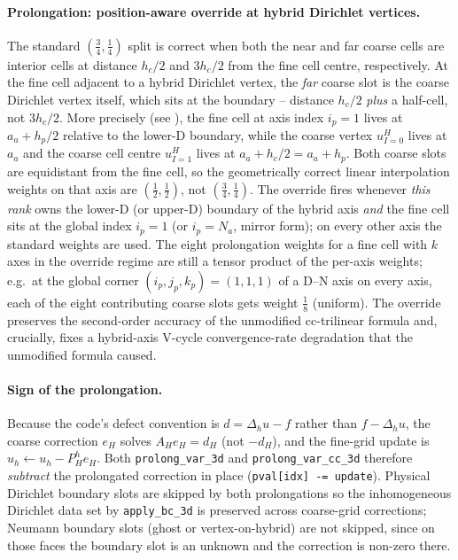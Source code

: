 \documentclass[11pt]{article}
\theoremstyle{definition}
\begin{document}
\paragraph{Prolongation: position-aware override at hybrid Dirichlet
vertices.}
The standard $(\tfrac{3}{4}, \tfrac{1}{4})$ split is correct when
both the near and far coarse cells are interior cells at distance
$h_c / 2$ and $3 h_c / 2$ from the fine cell centre, respectively.
At the fine cell adjacent to a hybrid Dirichlet vertex, the
\emph{far} coarse slot is the coarse Dirichlet vertex itself,
which sits at the boundary -- distance $h_c / 2$ \emph{plus} a
half-cell, not $3 h_c / 2$.  More precisely (see
), the fine cell at axis index $i_p = 1$
lives at $a_a + h_p / 2$ relative to the lower-D boundary, while
the coarse vertex $u^H_{I=0}$ lives at $a_a$ and the coarse cell
centre $u^H_{I=1}$ lives at $a_a + h_c / 2 = a_a + h_p$.  Both
coarse slots are equidistant from the fine cell, so the
geometrically correct linear interpolation weights on that axis
are $(\tfrac{1}{2}, \tfrac{1}{2})$, not
$(\tfrac{3}{4}, \tfrac{1}{4})$.  The override fires whenever
\emph{this rank} owns the lower-D (or upper-D) boundary of the
hybrid axis \emph{and} the fine cell sits at the global index
$i_p = 1$ (or $i_p = N_a$, mirror form); on every other axis the
standard weights are used.  The eight prolongation weights for a
fine cell with $k$ axes in the override regime are still a tensor
product of the per-axis weights; e.g.\ at the global corner
$(i_p, j_p, k_p) = (1, 1, 1)$ of a D--N axis on every axis, each
of the eight contributing coarse slots gets weight $\tfrac{1}{8}$
(uniform).  The override preserves the second-order accuracy of
the unmodified cc-trilinear formula and, crucially, fixes a
hybrid-axis V-cycle convergence-rate degradation that the
unmodified formula caused.

\paragraph{Sign of the prolongation.}
Because the code's defect convention is $d = \Delta_h u - f$ rather
than $f - \Delta_h u$, the coarse correction $e_H$ solves
$A_H e_H = d_H$ (not $-d_H$), and the fine-grid update is
$u_h \leftarrow u_h - P_H^h e_H$.  Both \texttt{prolong\_var\_3d}
and \texttt{prolong\_var\_cc\_3d} therefore \emph{subtract} the
prolongated correction in place (\verb|pval[idx] -= update|).
Physical Dirichlet boundary slots are skipped by both prolongations
so the inhomogeneous Dirichlet data set by \texttt{apply\_bc\_3d}
is preserved across coarse-grid corrections; Neumann boundary slots
(ghost or vertex-on-hybrid) are not skipped, since on those faces
the boundary slot is an unknown and the correction is non-zero
there.
\end{document}
